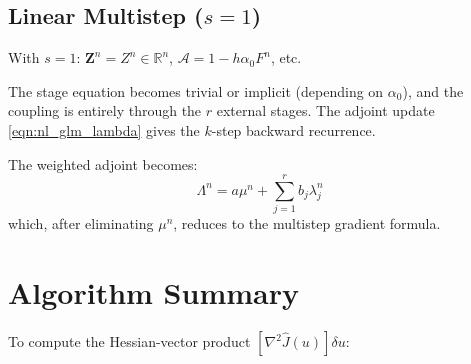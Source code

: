 \documentclass[11pt]{article}
\newcommand{\RR}{\mathbb{R}}
\newcommand{\Zv}{\mathbf{Z}}
\newcommand{\Av}{\mathcal{A}}
\begin{document}
\subsection{Linear Multistep ($s = 1$)}

With $s = 1$: $\Zv^n = Z^n \in \RR^n$, $\Av = 1 - h\alpha_0 F^n$, etc.

The stage equation becomes trivial or implicit (depending on $\alpha_0$), and the coupling is entirely through the $r$ external stages. The adjoint update \eqref{eqn:nl_glm_lambda} gives the $k$-step backward recurrence.

The weighted adjoint becomes:
\begin{equation}
\Lambda^n = a \mu^n + \sum_{j=1}^r b_j \lambda_j^n
\end{equation}
which, after eliminating $\mu^n$, reduces to the multistep gradient formula.

\section{Algorithm Summary}

To compute the Hessian-vector product $[\nabla^2\hat{J}(u)]\delta u$:
\end{document}
